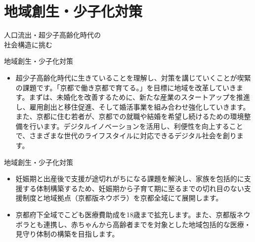 \documentclass[dvipdfmx]{beamer}
\begin{document}
\section{地域創生・少子化対策}
    \begin{frame}{}{}
        \sectionpage
        \begin{center}
            \begin{large}
                \alert{人口流出・超少子高齢化時代の}\\\alert{社会構造に挑む}
            \end{large}
        \end{center}
    \end{frame}

    \begin{frame}{地域創生・少子化対策}{}
        \begin{small}
            \begin{itemize}
                \setlength{\itemsep}{2mm}
                \item 超少子高齢化時代に生きていることを理解し、対策を講じていくことが喫緊の課題です。「京都で働き京都で育てる。」を目標に地域を改革していきます。まずは、未婚化を改善するために、新たな産業のスタートアップを推進し、雇用創出と移住促進、そして婚活事業を組み合わせ強化していきます。また、京都に住む若者が、京都での就職や結婚を希望し続けるための環境整備を行います。デジタルイノベーションを活用し、利便性を向上することで、さまざまな世代のライフスタイルに対応できるデジタル社会を創ります。
            \end{itemize}
        \end{small}
    \end{frame}

    \begin{frame}{地域創生・少子化対策}{}
        \begin{small}
            \begin{itemize}
                \setlength{\itemsep}{2mm}
                \item 妊娠期と出産後で支援が途切れがちになる課題を解決し、家族を包括的に支援する体制構築するため、妊娠期から子育て期に至るまでの切れ目のない支援制度と地域拠点（京都版ネウボラ）を京都全域にて展開します。
                \item 京都府下全域でこども医療費助成を18歳まで拡充します。また、京都版ネウボラとも連携し、赤ちゃんから高齢者までを対象とした地域包括的な医療・見守り体制の構築を目指します。
            \end{itemize}
        \end{small}
    \end{frame}
\end{document}
